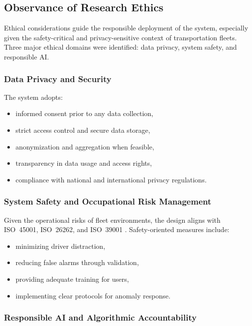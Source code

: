 \subsection{Observance of Research Ethics}

Ethical considerations guide the responsible deployment of the system, especially given the safety-critical and privacy-sensitive context of transportation fleets. Three major ethical domains were identified: data privacy, system safety, and responsible AI.

\subsubsection*{Data Privacy and Security}

The system adopts:

\begin{itemize}
    \item informed consent prior to any data collection,
    \item strict access control and secure data storage,
    \item anonymization and aggregation when feasible,
    \item transparency in data usage and access rights,
    \item compliance with national and international privacy regulations.
\end{itemize}

\subsubsection*{System Safety and Occupational Risk Management}

Given the operational risks of fleet environments, the design aligns with ISO~45001, ISO~26262, and ISO~39001 \cite{iso45001, iso26262, iso39001}. Safety-oriented measures include:

\begin{itemize}
    \item minimizing driver distraction,
    \item reducing false alarms through validation,
    \item providing adequate training for users,
    \item implementing clear protocols for anomaly response.
\end{itemize}

\subsubsection*{Responsible AI and Algorithmic Accountability}

